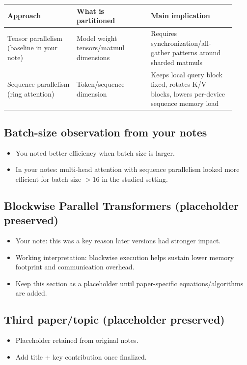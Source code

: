 \documentclass[11pt]{article}
\begin{document}
\begin{center}
\renewcommand{\arraystretch}{1.15}
\begin{tabular}{|p{0.28\linewidth}|p{0.30\linewidth}|p{0.34\linewidth}|}
\hline
\textbf{Approach} & \textbf{What is partitioned} & \textbf{Main implication} \\
\hline
Tensor parallelism (baseline in your note) & Model weight tensors/matmul dimensions & Requires synchronization/all-gather patterns around sharded matmuls \\
\hline
Sequence parallelism (ring attention) & Token/sequence dimension & Keeps local query block fixed, rotates K/V blocks, lowers per-device sequence memory load \\
\hline
\end{tabular}
\end{center}

\subsection{Batch-size observation from your notes}
\begin{itemize}[leftmargin=1.2em]
\item You noted better efficiency when batch size is larger.
\item In your notes: multi-head attention with sequence parallelism looked more efficient for batch size \(>16\) in the studied setting.
\end{itemize}

\subsection{Blockwise Parallel Transformers (placeholder preserved)}
\begin{itemize}[leftmargin=1.2em]
\item Your note: this was a key reason later versions had stronger impact.
\item Working interpretation: blockwise execution helps sustain lower memory footprint and communication overhead.
\item Keep this section as a placeholder until paper-specific equations/algorithms are added.
\end{itemize}

\subsection{Third paper/topic (placeholder preserved)}
\begin{itemize}[leftmargin=1.2em]
\item Placeholder retained from original notes.
\item Add title + key contribution once finalized.
\end{itemize}
\end{document}

